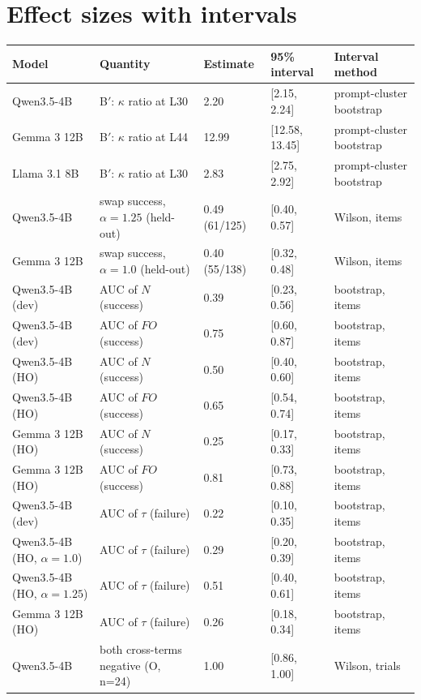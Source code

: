 \documentclass[10pt]{article}
\begin{document}
\section{Effect sizes with intervals}
\label{app:effects}
\begin{table}[h]
\centering\footnotesize
\begin{tabular}{@{}p{2.9cm}p{5.1cm}p{1.9cm}p{2.2cm}p{2.3cm}@{}}
\toprule
Model & Quantity & Estimate & 95\% interval & Interval method \\
\midrule
Qwen3.5-4B & B$'$: $\kappa$ ratio at L30 & 2.20 & [2.15, 2.24] & prompt-cluster bootstrap \\
Gemma 3 12B & B$'$: $\kappa$ ratio at L44 & 12.99 & [12.58, 13.45] & prompt-cluster bootstrap \\
Llama 3.1 8B & B$'$: $\kappa$ ratio at L30 & 2.83 & [2.75, 2.92] & prompt-cluster bootstrap \\
Qwen3.5-4B & swap success, $\alpha=1.25$ (held-out) & 0.49 (61/125) & [0.40, 0.57] & Wilson, items \\
Gemma 3 12B & swap success, $\alpha=1.0$ (held-out) & 0.40 (55/138) & [0.32, 0.48] & Wilson, items \\
Qwen3.5-4B (dev) & AUC of $N$ (success) & 0.39 & [0.23, 0.56] & bootstrap, items \\
Qwen3.5-4B (dev) & AUC of $FO$ (success) & 0.75 & [0.60, 0.87] & bootstrap, items \\
Qwen3.5-4B (HO) & AUC of $N$ (success) & 0.50 & [0.40, 0.60] & bootstrap, items \\
Qwen3.5-4B (HO) & AUC of $FO$ (success) & 0.65 & [0.54, 0.74] & bootstrap, items \\
Gemma 3 12B (HO) & AUC of $N$ (success) & 0.25 & [0.17, 0.33] & bootstrap, items \\
Gemma 3 12B (HO) & AUC of $FO$ (success) & 0.81 & [0.73, 0.88] & bootstrap, items \\
Qwen3.5-4B (dev) & AUC of $\tau$ (failure) & 0.22 & [0.10, 0.35] & bootstrap, items \\
Qwen3.5-4B (HO, $\alpha=1.0$) & AUC of $\tau$ (failure) & 0.29 & [0.20, 0.39] & bootstrap, items \\
Qwen3.5-4B (HO, $\alpha=1.25$) & AUC of $\tau$ (failure) & 0.51 & [0.40, 0.61] & bootstrap, items \\
Gemma 3 12B (HO) & AUC of $\tau$ (failure) & 0.26 & [0.18, 0.34] & bootstrap, items \\
Qwen3.5-4B & both cross-terms negative (O, n=24) & 1.00 & [0.86, 1.00] & Wilson, trials \\

\end{tabular}
\end{table}
\end{document}
